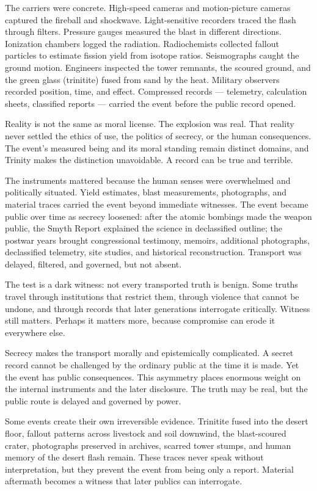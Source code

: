 The carriers were concrete. High-speed cameras and motion-picture
cameras captured the fireball and shockwave. Light-sensitive recorders
traced the flash through filters. Pressure gauges measured the blast in
different directions. Ionization chambers logged the radiation.
Radiochemists collected fallout particles to estimate fission yield from
isotope ratios. Seismographs caught the ground motion. Engineers
inspected the tower remnants, the scoured ground, and the green glass
(trinitite) fused from sand by the heat. Military observers recorded
position, time, and effect. Compressed records --- telemetry,
calculation sheets, classified reports --- carried the event before the
public record opened.

Reality is not the same as moral license. The explosion was real. That
reality never settled the ethics of use, the politics of secrecy, or the
human consequences. The event's measured being and its moral standing
remain distinct domains, and Trinity makes the distinction unavoidable.
A record can be true and terrible.

The instruments mattered because the human senses were overwhelmed and
politically situated. Yield estimates, blast measurements, photographs,
and material traces carried the event beyond immediate witnesses. The
event became public over time as secrecy loosened: after the atomic bombings made the weapon public, the Smyth Report
explained the science in declassified outline; the postwar years brought
congressional testimony, memoirs, additional photographs, declassified
telemetry, site studies, and historical reconstruction. Transport was
delayed, filtered, and governed, but not absent.

The test is a dark witness: not every transported truth is benign. Some
truths travel through institutions that restrict them, through violence
that cannot be undone, and through
records that later generations interrogate critically. Witness still
matters. Perhaps it matters more, because compromise can erode it
everywhere else.

Secrecy makes the transport morally and epistemically complicated. A
secret record cannot be challenged by the ordinary public at the time it
is made. Yet the event has public consequences. This asymmetry places
enormous weight on the internal instruments and the later disclosure.
The truth may be real, but the public route is delayed and governed by
power.

Some events create their own irreversible evidence. Trinitite fused into
the desert floor, fallout patterns across livestock and soil downwind,
the blast-scoured crater, photographs preserved in archives, scarred
tower stumps, and human memory of the desert flash remain. These traces
never speak without interpretation, but they prevent the event from
being only a report. Material aftermath becomes a witness that later
publics can interrogate.

